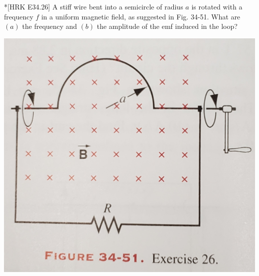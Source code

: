 \documentclass[11pt,letterpaper,boxed]{hmcpset}
\begin{document}
	\begin{problem} *[HRK E34.26] A stiff wire bent into a semicircle of radius $a$ is rotated with a frequency $f$ in a uniform magnetic field, as suggested in Fig. 34-51. What are $(a)$ the frequency and $(b)$ the amplitude of the emf induced in the loop?
	\begin{center}
	    \includegraphics[scale = .075]{20191206_143753.jpg}
	\end{center}
	\end{problem}
	\begin{solution}
		\vfill
	\end{solution}
	\newpage
	
\end{document}
